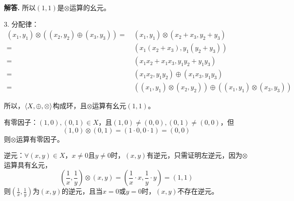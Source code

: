 \documentclass[12pt, a4paper, oneside]{ctexart}
\newenvironment{solution}{\par\noindent\textbf{解答. }}{\bigskip\par}
\begin{document}
\begin{solution}
    所以$(1,1)$是$\otimes$运算的幺元。

    3. 分配律：
    \begin{equation*}
        \begin{aligned}
            (x_1,y_1)\otimes((x_2,y_2)\oplus(x_3,y_3)) =\ &(x_1,y_1)\otimes(x_2+x_3,y_2+y_3)\\
            =\ &(x_1(x_2+x_3),y_1(y_2+y_3))\\
            =\ &(x_1x_2+x_1x_3,y_1y_2+y_1y_3)\\
            =\ &(x_1x_2,y_1y_2)\oplus(x_1x_3,y_1y_3)\\
            =\ &((x_1,y_1)\otimes(x_2,y_2))\oplus((x_1,y_1)\otimes(x_3,y_3))
        \end{aligned}
    \end{equation*}

    所以，$\braket{X,\oplus,\otimes}$构成环，且$\otimes$运算有幺元$(1,1)$。

    有零因子：$(1,0),(0,1)\in X$，且$(1,0)\neq (0,0),(0,1)\neq (0, 0)$，但
    \begin{equation*}
        (1,0)\otimes(0,1) = (1\cdot 0,0\cdot 1) = (0, 0)
    \end{equation*}
    则$\otimes$运算有零因子。

    逆元：$\forall (x, y)\in X$，$x\neq 0$且$y\neq 0$时，$(x, y)$有逆元，只需证明左逆元，因为$\otimes$运算具有幺元，
    \begin{equation*}
        (\frac{1}{x},\frac{1}{y})\otimes(x, y)=(\frac{1}{x}\cdot x,\frac{1}{y}\cdot y)=(1,1)
    \end{equation*}
    则$(\frac{1}{x},\frac{1}{y})$为$(x, y)$的逆元，且当$x=0$或$y=0$时，$(x,y)$不存在逆元。



\end{solution}
\end{document}
